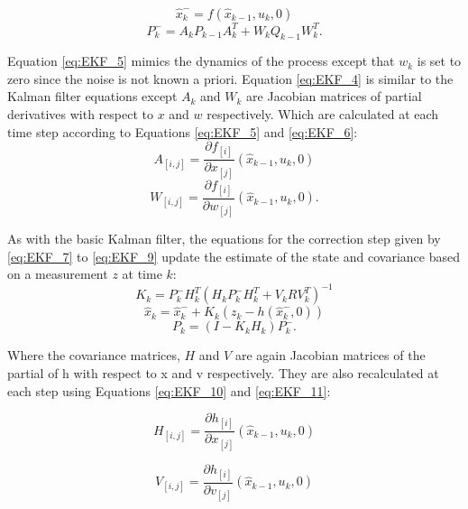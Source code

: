 \begin{equation}
 \label{eq:EKF_3}
 \hat{x}^-_k = f(\hat{x}_{k-1},u_k,0)
\end{equation}
\begin{equation}
 \label{eq:EKF_4}
 P^-_k = A_kP_{k-1}A_k^T + W_kQ_{k-1}W^T_k.
\end{equation}

Equation \ref{eq:EKF_5} mimics the dynamics of the process except that $ w_k $ is set to zero since the noise is not known a priori. Equation \ref{eq:EKF_4} is similar to the Kalman filter equations except $ A_k $ and $ W_k $ are Jacobian matrices of partial derivatives with respect to $ x $ and $ w $ respectively. Which are calculated at each time step according to Equations \ref{eq:EKF_5} and \ref{eq:EKF_6}:
\begin{equation}
\label{eq:EKF_5}
A_{[i,j]} = \frac{\partial f_{[i]}}{\partial x_{[j]}} (\hat{x}_{k-1},u_k,0)
\end{equation}
\begin{equation}
\label{eq:EKF_6}
W_{[i,j]} = \frac{\partial f_{[i]}}{\partial w_{[j]}} (\hat{x}_{k-1},u_k,0).
\end{equation}

As with the basic Kalman filter, the equations for the correction step given by \ref{eq:EKF_7} to \ref{eq:EKF_9} update the estimate of the state and covariance based on a measurement $ z $ at time $ k $:
\begin{equation}
\label{eq:EKF_7}
K_k = P^-_kH^T_k(H_kP^-_kH^T_k+V_kRV^T_k)^{-1}
\end{equation}
\begin{equation}
\label{eq:EKF_8}
\hat{x}_k = \hat{x}^-_k+K_k(z_k-h(\hat{x}^-_k,0))
\end{equation}
\begin{equation}
\label{eq:EKF_9}
P_k = (I-K_kH_k)P^-_k.
\end{equation} 

Where the covariance matrices, $ H $ and $ V $ are again Jacobian matrices of the partial of h with respect to x and v respectively. They are also recalculated at each step using Equations \ref{eq:EKF_10} and \ref{eq:EKF_11}:

\begin{equation}
\label{eq:EKF_10}
H_{[i,j]} = \frac{\partial h_{[i]}}{\partial x_{[j]}} (\hat{x}_{k-1},u_k,0)
\end{equation}

\begin{equation}
\label{eq:EKF_11}
V_{[i,j]} = \frac{\partial h_{[i]}}{\partial v_{[j]}} (\hat{x}_{k-1},u_k,0)
\end{equation}

